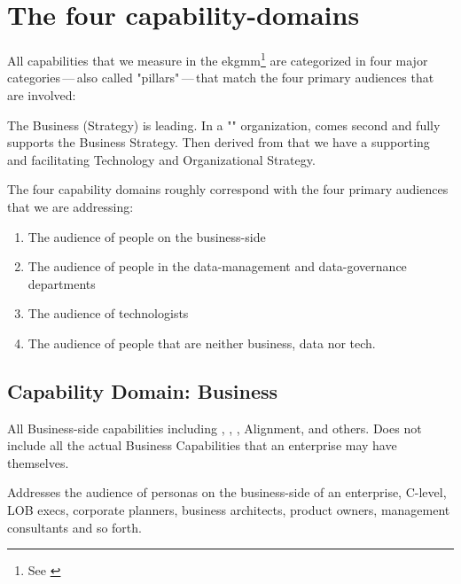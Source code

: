 \section{The four capability-domains}\label{sec:the-four-capability-domains}

All capabilities that we measure in the \gls{ekgmm}\footnote{See \cite{ekgmm}} are categorized
in four major categories\,---\,also called "pillars"\,---\,that match the four primary audiences that are involved:

The Business (Strategy) is leading.
In a "" organization,  comes second and fully supports the
Business Strategy.
Then derived from that we have a supporting and facilitating Technology and Organizational Strategy.

The four capability domains roughly correspond with the four primary audiences that we are addressing:

\begin{enumerate}
    \item The audience of people on the business-side
    \item The audience of people in the data-management and data-governance departments
    \item The audience of technologists
    \item The audience of people that are neither business, data nor tech.
\end{enumerate}

\subsection{Capability Domain: Business}

All Business-side capabilities including ,
 ,
 , Alignment,
 and others.
Does not include all the actual Business Capabilities  that
an enterprise may have themselves.

Addresses the audience of personas on the business-side of an enterprise, C-level, LOB execs, corporate planners,
business architects, product owners, management consultants and so forth.

